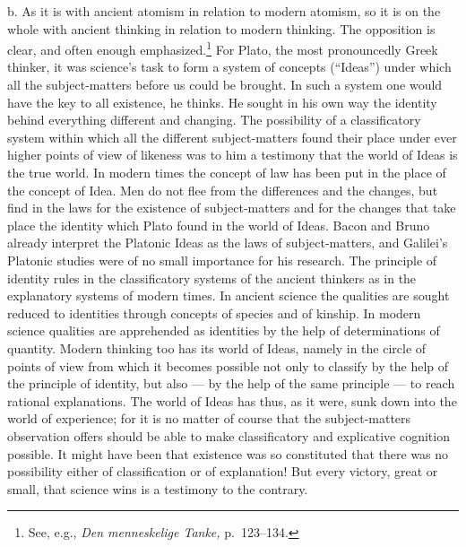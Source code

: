 \documentclass[12pt]{book}
\newcommand{\opage}[1]{\marginnote{\footnotesize\textit{[#1]}}}
\begin{document}
b. As it is with ancient atomism in relation to modern atomism, so it is on the
whole with ancient thinking in relation to modern thinking. The opposition is
clear, and often enough emphasized.\footnote{See, e.g., \textit{Den menneskelige
Tanke,} p.\ 123--134.} For Plato, the most pronouncedly Greek thinker, it was
science's task to form a system of concepts (``Ideas'') under which all the
subject-matters before us could be brought. In such a system one would have the
key to all existence, he thinks. He sought in his own way the identity behind
everything different and changing. The possibility of a classificatory system
within which all the different subject-matters found their place under ever
higher points of view of likeness was to him a testimony that the world of Ideas
is the true world. In modern times the concept of law has been put in the place
of the concept of Idea. Men do not flee from the differences and the changes, but
find in the laws for the existence of subject-matters and for the changes that
take place \opage{74}the identity which Plato found in the world of Ideas. Bacon and Bruno
already interpret the Platonic Ideas as the laws of subject-matters, and
Galilei's Platonic studies were of no small importance for his research. The
principle of identity rules in the classificatory systems of the ancient thinkers
as in the explanatory systems of modern times. In ancient science the qualities
are sought reduced to identities through concepts of species and of kinship. In
modern science qualities are apprehended as identities by the help of
determinations of quantity. Modern thinking too has its world of Ideas, namely in
the circle of points of view from which it becomes possible not only to classify
by the help of the principle of identity, but also --- by the help of the same
principle --- to reach rational explanations. The world of Ideas has thus, as it
were, sunk down into the world of experience; for it is no matter of course that
the subject-matters observation offers should be able to make classificatory and
explicative cognition possible. It might have been that existence was so
constituted that there was no possibility either of classification or of
explanation! But every victory, great or small, that science wins is a testimony
to the contrary.
\end{document}
